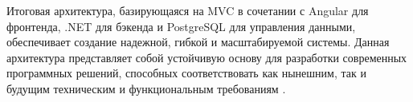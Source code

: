 Итоговая архитектура, базирующаяся на MVC в сочетании с Angular для фронтенда, .NET для бэкенда и PostgreSQL для управления данными, обеспечивает создание надежной, гибкой и масштабируемой системы. Данная архитектура представляет собой устойчивую основу для разработки современных программных решений, способных соответствовать как нынешним, так и будущим техническим и функциональным требованиям \cite{kofman}.

